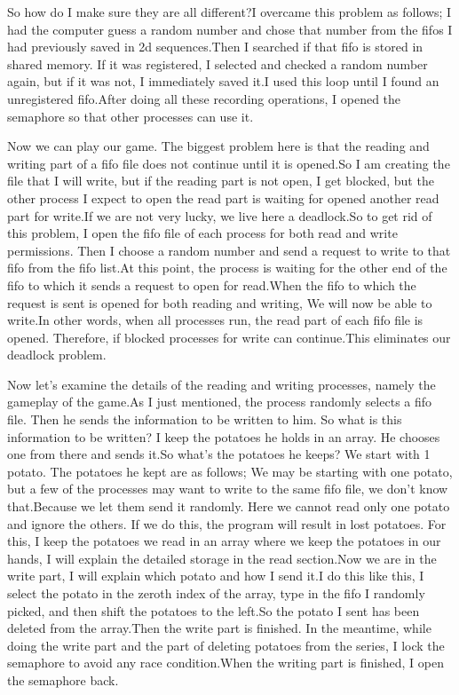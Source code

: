 \documentclass{article}
\begin{document}
So how do I make sure they are all different?I overcame this problem as follows; I had the computer guess a random number and chose that number from the fifos I had previously saved in 2d sequences.Then I searched if that fifo is stored in shared memory. If it was registered, I selected and checked a random number again, but if it was not, I immediately saved it.I used this loop until I found an unregistered fifo.After doing all these recording operations, I opened the semaphore so that other processes can use it.

Now we can play our game. The biggest problem here is that the reading and writing part of a fifo file does not continue until it is opened.So I am creating the file that I will write, but if the reading part is not open, I get blocked, but the other process I expect to open the read part is waiting for opened another read part for write.If we are not very lucky, we live here a deadlock.So to get rid of this problem, I open the fifo file of each process for both read and write permissions. Then I choose a random number and send a request to write to that fifo from the fifo list.At this point, the process is waiting for the other end of the fifo to which it sends a request to open for read.When the fifo to which the request is sent is opened for both reading and writing, We will now be able to write.In other words, when all processes run, the read part of each fifo file is opened. Therefore, if blocked processes for write can continue.This eliminates our deadlock problem.

Now let's examine the details of the reading and writing processes, namely the gameplay of the game.As I just mentioned, the process randomly selects a fifo file. Then he sends the information to be written to him. So what is this information to be written? I keep the potatoes he holds in an array. He chooses one from there and sends it.So what's the potatoes he keeps? We start with 1 potato. The potatoes he kept are as follows; We may be starting with one potato, but a few of the processes may want to write to the same fifo file, we don't know that.Because we let them send it randomly. Here we cannot read only one potato and ignore the others. If we do this, the program will result in lost potatoes. For this, I keep the potatoes we read in an array where we keep the potatoes in our hands, I will explain the detailed storage in the read section.Now we are in the write part, I will explain which potato and how I send it.I do this like this, I select the potato in the zeroth index of the array, type in the fifo I randomly picked, and then shift the potatoes to the left.So the potato I sent has been deleted from the array.Then the write part is finished. In the meantime, while doing the write part and the part of deleting potatoes from the series, I lock the semaphore to avoid any race condition.When the writing part is finished, I open the semaphore back.
\end{document}
